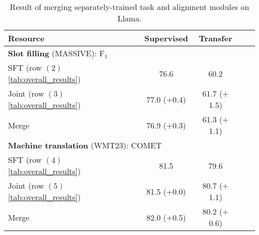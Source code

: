 \begin{table}[t!]
    \small
    \centering
    \setlength\tabcolsep{6.5pt}
    \begin{tabular}{l c c c c}
    \toprule
    \textbf{Resource}
    &\textbf{Supervised} 
    & \textbf{Transfer}
    \\
    \midrule
    \multicolumn{4}{l}{
    \textbf{Slot filling} (\textsc{MASSIVE}): F$_1$}  
    \\
    SFT (row $(2)$ \autoref{tab:overall_results}) &
    76.6 \phantom{($+$0.0)}&  
    60.2 \phantom{($+$0.0)}& 
    \\
    Joint (row $(3)$ \autoref{tab:overall_results}) &
    77.0 ($+$0.4) & 
    61.7 ($+$1.5)
    \\
    Merge &
    76.9 ($+$0.3) & 
    61.3 ($+$1.1) %
    \\
    \midrule
    \multicolumn{4}{l}{
    \textbf{Machine translation} (\textsc{WMT}23): COMET 
    } 
    \\
    SFT (row $(4)$ \autoref{tab:overall_results}) &
    81.5 \phantom{($+$0.0)}&  
    79.6 \phantom{($+$0.0)}& 
    \\
    Joint (row $(5)$ \autoref{tab:overall_results}) &
    81.5 ($+$0.0) & 
    80.7 ($+$1.1)
    \\
    Merge &
    82.0 ($+$0.5) & 
    80.2 ($+$0.6) %
    \\
    \bottomrule
    \end{tabular}
    \caption{Result of merging separately-trained task and alignment modules on Llama.\label{tab:merging}} %
\end{table}
